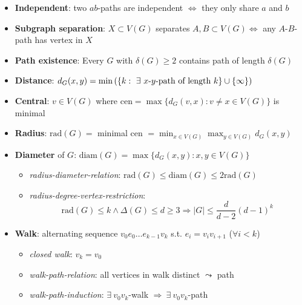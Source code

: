 \begin{itemize}
  \item \textbf{Independent}: two $ ab $-paths are independent $ \Leftrightarrow $ they only share $ a $ and $ b $
  \item \textbf{Subgraph separation}: $ X \subset V(G) $ separates $ A,B \subset V(G) \Leftrightarrow $ any $ A $-$ B $-path has vertex in $ X $
  \item \textbf{Path existence}: Every $ G $ with $ \delta(G) \geq 2 $ contains path of length $ \delta(G) $
  \item \textbf{Distance}: $ d_G(x,y) = \min\left( \{ k : \ \exists \text{ $ x $-$ y $-path of length } k \} \cup \{ \infty \} \right) $
  \item \textbf{Central}: $ v \in V(G) $ where $ \text{cen} = \max\{ d_G(v,x) : v \neq x \in V(G) \} $ is minimal
  \item \textbf{Radius}: $ \text{rad}(G) = $ minimal cen $ = \min_{x \in V(G)}\max_{y \in V(G)}d_G(x,y) $
  \item \textbf{Diameter} of $ G $: $ \text{diam}(G) = \max\{ d_G(x,y) : x,y \in V(G) \} $
  \begin{itemize}
    \item \emph{radius-diameter-relation}: $ \text{rad}(G) \leq \text{diam}(G) \leq 2\text{rad}(G) $
    \item \emph{radius-degree-vertex-restriction}:
    \begin{equation*}
      \text{rad}(G) \leq k \wedge \Delta(G) \leq d \geq 3 \Rightarrow \vert G \vert \leq \frac{d}{d-2}(d-1)^k
    \end{equation*}
  \end{itemize}
  \item \textbf{Walk}: alternating sequence $ v_0e_0\dots e_{k-1}v_k $ s.t. $ e_i = v_iv_{i+1} $ ($ \forall i < k $)
  \begin{itemize}
    \item \emph{closed walk}: $ v_k = v_0 $ 
    \item \emph{walk-path-relation}: all vertices in walk distinct $ \leadsto $ path
    \item \emph{walk-path-induction}: $ \exists \ v_0v_k $-walk $ \Rightarrow \ \exists \ v_0v_k $-path 
  \end{itemize}
\end{itemize}

